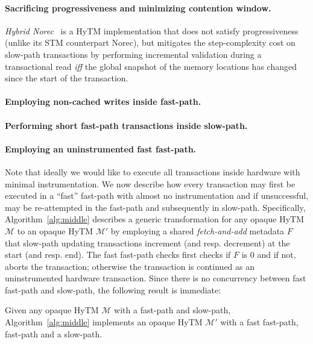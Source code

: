 \paragraph{Sacrificing progressiveness and minimizing contention window.}
%
\emph{Hybrid Norec}~\cite{hybridnorec} is a HyTM implementation that does not satisfy progressiveness
(unlike its STM counterpart Norec), but mitigates
the step-complexity cost on slow-path transactions by performing incremental validation during a transactional read \emph{iff} 
the global snapshot of the memory locations has changed since the start of the transaction.
%


\paragraph{Employing non-cached writes inside fast-path.}

\paragraph{Performing short fast-path transactions inside slow-path.}

\paragraph{Employing an uninstrumented fast fast-path.}
Note that ideally we would like to execute all transactions inside hardware with minimal instrumentation.
We now describe how every transaction may first be executed in a ``fast'' fast-path with almost no instrumentation
and if unsuccessful, may be re-attempted in the fast-path and subsequently in slow-path.
Specifically, Algorithm~\ref{alg:middle} describes a generic transformation for any opaque HyTM $\mathcal{M}$ to an opaque
HyTM $\mathcal{M}'$ by employing a shared \emph{fetch-and-add} metadata $F$ that slow-path updating transactions
increment (and resp. decrement) at the start (and resp. end). The fast fast-path checks first checks if $F$ is $0$
and if not, aborts the transaction; otherwise the transaction is continued as an uninstrumented hardware transaction.
Since there is no concurrency between fast fast-path and slow-path, the following result is immediate:
%
%
\begin{theorem}
Given any opaque HyTM $\mathcal{M}$ with a fast-path and slow-path, Algorithm~\ref{alg:middle} implements an opaque HyTM $\mathcal{M}'$
with a fast fast-path, fast-path and a slow-path.
\end{theorem}
%

%